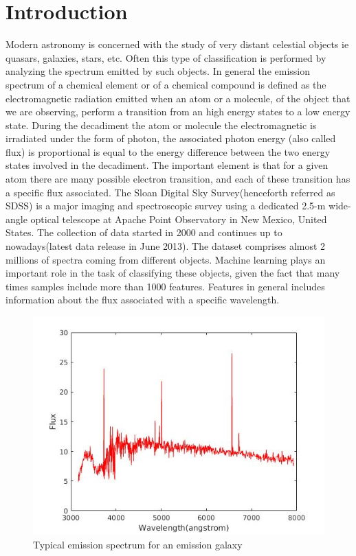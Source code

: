 \documentclass[a4paper,10pt]{article}
\begin{document}
\section{Introduction}
  Modern astronomy is concerned with the study of very distant celestial objects ie quasars, galaxies, stars, etc.\newline
  Often this type of classification is performed by analyzing the spectrum emitted by such objects.\newline
  In general the emission spectrum of a chemical element or of a chemical compound is defined as the electromagnetic radiation emitted
  when an atom or a molecule, of the object that we are observing, perform a transition from an high energy states to a low energy state.
  During the decadiment the atom or molecule the electromagnetic is irradiated under the form of photon, the associated photon energy
  (also called flux) is proportional is equal to the energy difference between the two energy states involved in the decadiment.\newline
  The important element is that for a given atom there are many possible electron transition, and each of these transition has a specific
  flux associated.\newline
  The Sloan Digital Sky Survey(henceforth referred as SDSS) is a major imaging and spectroscopic survey using a dedicated 2.5-m wide-angle
  optical telescope at Apache Point Observatory in New Mexico, United States.\newline
  The collection of data started in 2000 and continues up to nowadays(latest data release in June 2013). The dataset comprises almost
  2 millions of spectra coming from different objects.\newline
  Machine learning plays an important role in the task of classifying these objects, given the fact that many times samples include
  more than 1000 features.\newline
  Features in general includes information about the flux associated with a specific wavelength.
  
  \begin{figure}[H]
    \caption{Typical emission spectrum for an emission galaxy}
    \centering
    \includegraphics[scale=0.5]{emission_galaxy.jpg}
  \end{figure}
  
\end{document}
